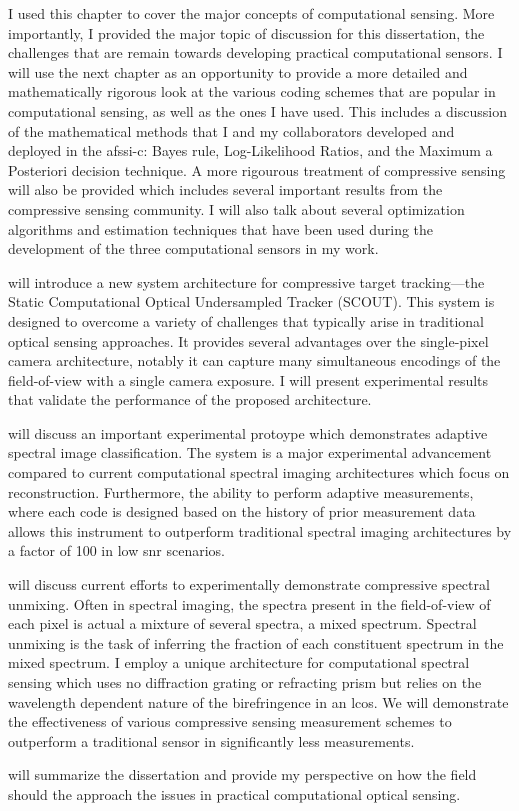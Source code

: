 I used this chapter to cover the major concepts of computational sensing. More importantly, I provided the major topic of discussion for this dissertation, the challenges that are remain towards developing practical computational sensors. I will use the next chapter as an opportunity to provide a more detailed and mathematically rigorous look at the various coding schemes that are popular in computational sensing, as well as the ones I have used. This includes a discussion of the mathematical methods that I and my collaborators developed and deployed in the \gls{afssi-c}: Bayes rule, Log-Likelihood Ratios, and the Maximum a Posteriori decision technique. A more rigourous treatment of compressive sensing will also be provided which includes several important results from the compressive sensing community. I will also talk about several optimization algorithms and estimation techniques that have been used during the development of the three computational sensors in my work.

 will introduce a new system architecture for compressive target tracking---the Static Computational Optical Undersampled Tracker (SCOUT). This system is designed to overcome a variety of challenges that typically arise in traditional optical sensing approaches. It provides several advantages over the single-pixel camera architecture, notably it can capture many simultaneous encodings of the field-of-view with a single camera exposure. I will present experimental results that validate the performance of the proposed architecture. 

 will discuss an important experimental protoype which demonstrates adaptive spectral image classification. The system is a major experimental advancement compared to current computational spectral imaging architectures which focus on reconstruction. Furthermore, the ability to perform adaptive measurements, where each code is designed based on the history of prior measurement data allows this instrument to outperform traditional spectral imaging architectures by a factor of 100 in low \gls{snr} scenarios.

 will discuss current efforts to experimentally demonstrate compressive spectral unmixing. Often in spectral imaging, the spectra present in the field-of-view of each pixel is actual a mixture of several spectra, a mixed spectrum. Spectral unmixing is the task of inferring the fraction of each constituent spectrum in the mixed spectrum. I employ a unique architecture for computational spectral sensing which uses no diffraction grating or refracting prism but relies on the wavelength dependent nature of the birefringence in an \gls{lcos}. We will demonstrate the effectiveness of various compressive sensing measurement schemes to outperform a traditional sensor in significantly less measurements. 

 will summarize the dissertation and provide my perspective on how the field should the approach the issues in practical computational optical sensing.


%  
%

